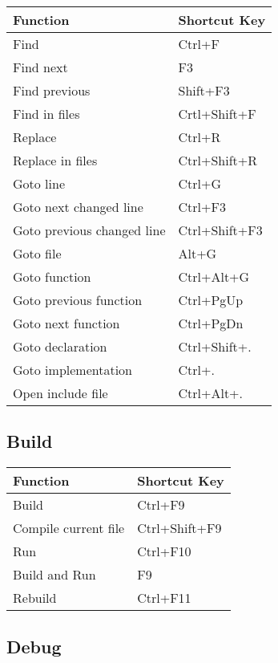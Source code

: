 \begin{tabular}{|l|l|}\hline
Function 	                &	Shortcut Key\\ \hline
Find 		                &	Ctrl+F\\ \hline
Find next 	                &	F3\\ \hline
Find previous 	            &	Shift+F3\\ \hline
Find in files 	            &	Crtl+Shift+F\\ \hline
Replace 	                &	Ctrl+R\\ \hline
Replace in files            &	Ctrl+Shift+R\\ \hline
Goto line 	                &	Ctrl+G\\ \hline
Goto next changed line 	    &	Ctrl+F3\\ \hline
Goto previous changed line 	&	Ctrl+Shift+F3\\ \hline
Goto file 	                &	Alt+G\\ \hline
Goto function 	            &	Ctrl+Alt+G\\ \hline
Goto previous function      &   Ctrl+PgUp\\ \hline
Goto next function          &   Ctrl+PgDn\\ \hline
Goto declaration            &   Ctrl+Shift+.\\ \hline
Goto implementation         &   Ctrl+.\\ \hline
Open include file           &   Ctrl+Alt+.\\ \hline
\end{tabular}

\subsection{Build}

\begin{tabular}{|l|l|}\hline
Function 	            &	Shortcut Key\\ \hline
Build 		            &	Ctrl+F9\\ \hline
Compile current file	&	Ctrl+Shift+F9\\ \hline
Run		                &	Ctrl+F10\\ \hline
Build and Run 	        &	F9\\ \hline
Rebuild 	            &	Ctrl+F11\\ \hline
\end{tabular}

\subsection{Debug}

